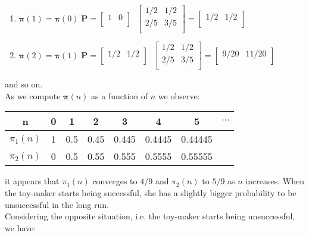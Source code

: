 \documentclass[\main/main.tex]{subfiles}
\begin{document}
\begin{small}
\begin{enumerate}
    \item $\bm{\pi}(1) = \bm{\pi}(0) \; \mathbf{P} = 
  \begin{bmatrix}
    1 & 0\\
  \end{bmatrix}
 \; \;   \begin{bmatrix}
1/2 & 1/2\\
2/5 & 3/5\\
  \end{bmatrix} = \begin{bmatrix}
    1/2 & 1/2\\
  \end{bmatrix}$
  \item $\bm{\pi}(2) = \bm{\pi}(1) \; \mathbf{P} = 
  \begin{bmatrix}
    1/2 & 1/2\\
  \end{bmatrix}
 \; \;
 \begin{bmatrix}
    1/2 & 1/2\\
    2/5 & 3/5\\
  \end{bmatrix} = \begin{bmatrix}
    9/20 & 11/20\\
  \end{bmatrix}$
\end{enumerate}
and so on.\\

\noindent As we compute $\bm{\pi}(n)$ as a function of $n$ we observe:

\begin{center} 
\begin{tabular}{ c|c|c|c|c|c|c|c  } 
 n & 0 & 1 & 2 & 3& 4 & 5 &$\cdots$ \\ 
  \hline
 $\pi_1(n)$ & 1& 0.5& 0.45& 0.445& 0.4445&0.44445 \\ 
 $\pi_2(n)$  & 0 & 0.5  & 0.55&0.555 &0.5555&0.55555\\ 
\end{tabular}
\end{center}
it appears that $\pi_1(n)$ converges to $4/9$ and $\pi_2(n)$ to $5/9$ as $n$ increases. When the toy-maker starts being successful, she has a slightly bigger probability to be unsuccessful in the long run.  \\

\noindent Considering the opposite situation, i.e. the toy-maker starts being unsuccessful, we have:


\end{small}
\end{document}

